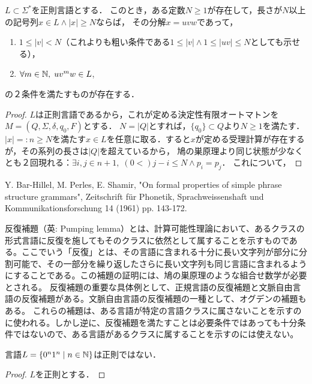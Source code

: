 \documentclass[uplatex, dvipdfmx]{jsreport}
\begin{document}
\begin{theorem}\label{thm-Pumpimg-lemma}
    $L\subset\Sigma^*$を正則言語とする．
    このとき，ある定数$N\ge 1$が存在して，長さが$N$以上の記号列$x\in L\land |x|\ge N$ならば，
    その分解$x=uvw$であって，
    \begin{enumerate}
        \item $1\le |v|<N$（これよりも粗い条件である$1\le |v|\land 1\le|uv|\le N$としても示せる），
        \item $\forall m\in\mathbb{N},\; uv^mw\in L$,
    \end{enumerate}
    の２条件を満たすものが存在する．
\end{theorem}
\begin{proof}
    $L$は正則言語であるから，これが定める決定性有限オートマトンを$M=(Q,\Sigma,\delta,q_0,F)$とする．
    $N=|Q|$とすれば，$\{q_0\}\subset Q$より$N\ge 1$を満たす．
    $|x|=:n\ge N$を満たす$x\in L$を任意に取る．すると$x$が定める受理計算が存在するが，その系列の長さは$|Q|$を超えているから，
    鳩の巣原理より同じ状態が少なくとも２回現れる：$\exists i,j\in n+1,\;(0<)j-i\le N\land p_i=p_j$．
    これについて，
\end{proof}
\begin{remark}
    Y. Bar-Hillel, M. Perles, E. Shamir, "On formal properties of simple phrase structure grammars", Zeitschrift für Phonetik, Sprachweissenshaft und Kommunikationsforschung 14 (1961) pp. 143-172.

    反復補題（英: Pumping lemma）とは、計算可能性理論において、あるクラスの形式言語に反復を施してもそのクラスに依然として属することを示すものである。ここでいう「反復」とは、その言語に含まれる十分に長い文字列が部分に分割可能で、その一部分を繰り返したさらに長い文字列も同じ言語に含まれるようにすることである。この補題の証明には、鳩の巣原理のような組合せ数学が必要とされる。
    反復補題の重要な具体例として、正規言語の反復補題と文脈自由言語の反復補題がある。文脈自由言語の反復補題の一種として、オグデンの補題もある。
    これらの補題は、ある言語が特定の言語クラスに属さないことを示すのに使われる。しかし逆に、反復補題を満たすことは必要条件ではあっても十分条件ではないので、ある言語があるクラスに属することを示すのには使えない。
\end{remark}

\begin{corollary}
    言語$L=\{0^n1^n\mid n\in\mathbb{N}\}$は正則ではない．
\end{corollary}
\begin{proof}
    $L$を正則とする．
\end{proof}
\end{document}
